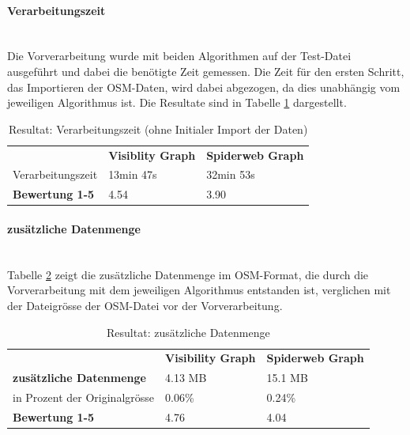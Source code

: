 \paragraph{Verarbeitungszeit}\label{result:Verarbeitungszeit}~\\
Die Vorverarbeitung wurde mit beiden Algorithmen auf der Test-Datei ausgeführt und dabei die benötigte Zeit gemessen. Die Zeit für den ersten Schritt, das Importieren der \ac{OSM}-Daten, wird dabei abgezogen, da dies unabhängig vom jeweiligen Algorithmus ist. Die Resultate sind in Tabelle \ref{Resultat: Verarbeitungszeit} dargestellt.

\begin{table}[H]
    \centering
    \caption{Resultat: Verarbeitungszeit (ohne Initialer Import der Daten)}
    \label{Resultat: Verarbeitungszeit}
    \begin{tabular}{lll}
        & \textbf{Visiblity Graph} & \textbf{Spiderweb Graph}     \\
        Verarbeitungszeit  &        13min 47s                   & 32min 53s    \\
        \textbf{Bewertung 1-5} &    4.54                     &  3.90
    \end{tabular}
\end{table}


\paragraph{zusätzliche Datenmenge}\label{result:zusätzliche Datenmenge}~\\
Tabelle \ref{table: zusätzliche Datenmenge} zeigt die zusätzliche Datenmenge im \ac{OSM}-Format, die durch die Vorverarbeitung mit dem jeweiligen Algorithmus entstanden ist, verglichen mit der Dateigrösse der \ac{OSM}-Datei vor der Vorverarbeitung.

\begin{table}[H]
    \centering
    \caption{Resultat: zusätzliche Datenmenge}
    \label{table: zusätzliche Datenmenge}
    \begin{tabular}{lll}
        & \textbf{Visibility Graph} & \textbf{Spiderweb Graph} \\
        \textbf{zusätzliche Datenmenge} & 4.13 MB                    & 15.1 MB  \\  
        in Prozent der Originalgrösse   & 0.06\%                     & 0.24\%   \\
        \textbf{Bewertung 1-5}          & 4.76                       & 4.04
    \end{tabular}
\end{table}


